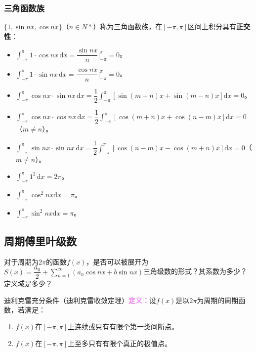 \subsubsection{三角函数族}

$\{1,\sin nx,\cos nx\}$（$n\in N*$）称为三角函数族，在$[-\pi,\pi]$区间上积分具有\textbf{正交性}：

\begin{itemize}
    \item $\displaystyle{\int_{-\pi}^\pi1\cdot\cos nx\,\textrm{d}x}=\dfrac{\sin nx}{n}\bigg\vert_{-\pi}^\pi=0$。
    \item $\displaystyle{\int_{-\pi}^\pi1\cdot\sin nx\,\textrm{d}x}=\dfrac{\cos nx}{n}\bigg\vert_{-\pi}^\pi=0$。
    \item $\displaystyle{\int_{-\pi}^\pi\cos nx\cdot\sin nx\,\textrm{d}x=\dfrac{1}{2}\int_{-\pi}^\pi[\sin(m+n)x+\sin(m-n)x]\textrm{d}x}=0$。
    \item $\displaystyle{\int_{-\pi}^\pi\cos nx\cdot\cos nx\,\textrm{d}x=\dfrac{1}{2}\int_{-\pi}^\pi[\cos(m+n)x+\cos(n-m)x]\textrm{d}x}=0$（$m\neq n$）。
    \item $\displaystyle{\int_{-\pi}^\pi\sin nx\cdot\sin nx\,\textrm{d}x=\dfrac{1}{2}\int_{-\pi}^\pi[\cos(n-m)x-\cos(m+n)x]\textrm{d}x}=0$（$m\neq n$）。
    \item $\displaystyle{\int_{-\pi}^\pi1^2\,\textrm{d}x=2\pi}$。
    \item $\displaystyle{\int_{-\pi}^\pi\cos^2nx\textrm{d}x=\pi}$。
    \item $\displaystyle{\int_{-\pi}^\pi\sin^2nx\textrm{d}x=\pi}$。
\end{itemize}

\subsection{周期傅里叶级数}

对于周期为$2\pi$的函数$f(x)$，是否可以被展开为$S(x)=\dfrac{a_0}{2}+\sum\limits_{n=1}^\infty(a_n\cos nx+b\sin nx)$三角级数的形式？其系数为多少？定义域是多少？

迪利克雷充分条件（迪利克雷收敛定理）\textcolor{violet}{\textbf{定义：}}设$f(x)$是以$2\pi$为周期的周期函数，若满足：

\begin{enumerate}
    \item  $f(x)$在$[-\pi,\pi]$上连续或只有有限个第一类间断点。
    \item $f(x)$在$[-\pi,\pi]$上至多只有有限个真正的极值点。
\end{enumerate}

